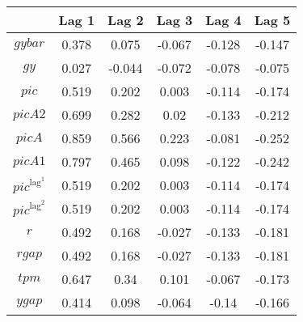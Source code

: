 \begin{tabular}{c|ccccc|}
  & Lag 1 & Lag 2 & Lag 3 & Lag 4 & Lag 5\\
\hline
${g\!y\!b\!a\!r}$ & 0.378 & 0.075 & -0.067 & -0.128 & -0.147 \\
${g\!y}$ & 0.027 & -0.044 & -0.072 & -0.078 & -0.075 \\
${p\!i\!c}$ & 0.519 & 0.202 & 0.003 & -0.114 & -0.174 \\
${p\!i\!c\!A\!2}$ & 0.699 & 0.282 & 0.02 & -0.133 & -0.212 \\
${p\!i\!c\!A}$ & 0.859 & 0.566 & 0.223 & -0.081 & -0.252 \\
${p\!i\!c\!A\!1}$ & 0.797 & 0.465 & 0.098 & -0.122 & -0.242 \\
${p\!i\!c}^{\mathrm{lag}^{\mathrm{1}}}$ & 0.519 & 0.202 & 0.003 & -0.114 & -0.174 \\
${p\!i\!c}^{\mathrm{lag}^{\mathrm{2}}}$ & 0.519 & 0.202 & 0.003 & -0.114 & -0.174 \\
$r$ & 0.492 & 0.168 & -0.027 & -0.133 & -0.181 \\
${r\!g\!a\!p}$ & 0.492 & 0.168 & -0.027 & -0.133 & -0.181 \\
${t\!p\!m}$ & 0.647 & 0.34 & 0.101 & -0.067 & -0.173 \\
${y\!g\!a\!p}$ & 0.414 & 0.098 & -0.064 & -0.14 & -0.166 \\
\hline
\end{tabular}


